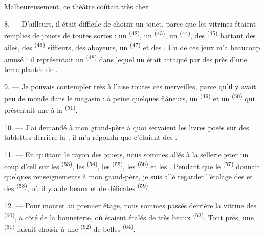 Malheureusement, ce théâtre coûtait très cher.

8. --- D'ailleurs, il était difficile de choisir un jouet, parce que les
vitrines étaient remplies de jouets de toutes sortes : un 
\textsuperscript{(42)}, un  \textsuperscript{(43)}, un
 \textsuperscript{(44)}, des 
\textsuperscript{(45)} battant des ailes, des 
\textsuperscript{(46)} siffleurs, des  aboyeurs, un
 \textsuperscript{(47)} et des . Un
de ces jeux m'a beaucoup amusé : il représentait un 
\textsuperscript{(48)} dans lequel un  était attaqué par des
 près d'une terre plantée de .


9. --- Je pouvais contempler très à l'aise toutes ces merveilles, parce qu'il y
avait peu de monde dans le magasin : à peine quelques flâneurs, un
 \textsuperscript{(49)} et un 
\textsuperscript{(50)} qui présentait une  à la
 \textsuperscript{(51)}.

10. --- J'ai demandé à mon grand-père à quoi servaient les livres posés sur des
tablettes derrière la ; il m'a répondu que c'étaient des
.

\VUsaut{3.6mm}
\VUsaut{2.8mm}

11. --- En quittant le rayon des jouets, nous sommes allés à la sellerie jeter
un coup d'œil sur les  \textsuperscript{(53)}, les
 \textsuperscript{(54)}, les 
\textsuperscript{(55)}, les  \textsuperscript{(56)} et les
. Pendant que le  \textsuperscript{(57)}
donnait quelques renseignements à mon grand-père, je suis allé regarder
l'étalage des  et des 
\textsuperscript{(58)}, où il y a de beaux  et de délicates
 \textsuperscript{(59)}.

12. --- Pour monter au premier étage, nous sommes passés derrière la vitrine des
 \textsuperscript{(60)}, à côté de la bonneterie, où étaient
étalés de très beaux  \textsuperscript{(63)}. Tout près, une
 \textsuperscript{(61)} faisait choisir à une 
\textsuperscript{(62)} de belles  \textsuperscript{(64)}.

